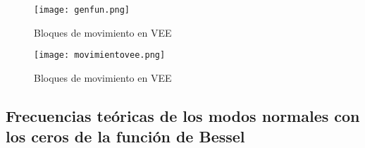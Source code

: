 \documentclass[journal, a4paper,onecolumn]{IEEEtran}
\begin{document}
  \begin{figure}[H]
    \centering
    \texttt{[image: genfun.png]}
    \caption{Bloques de movimiento en VEE}
    
\end{figure} 

\begin{figure}[H]
    \centering
    \texttt{[image: movimientovee.png]}
    \caption{Bloques de movimiento en VEE}
    \label{movvee}
\end{figure}

\subsection{Frecuencias teóricas de los modos normales con los ceros de la función de Bessel}
\end{document}
